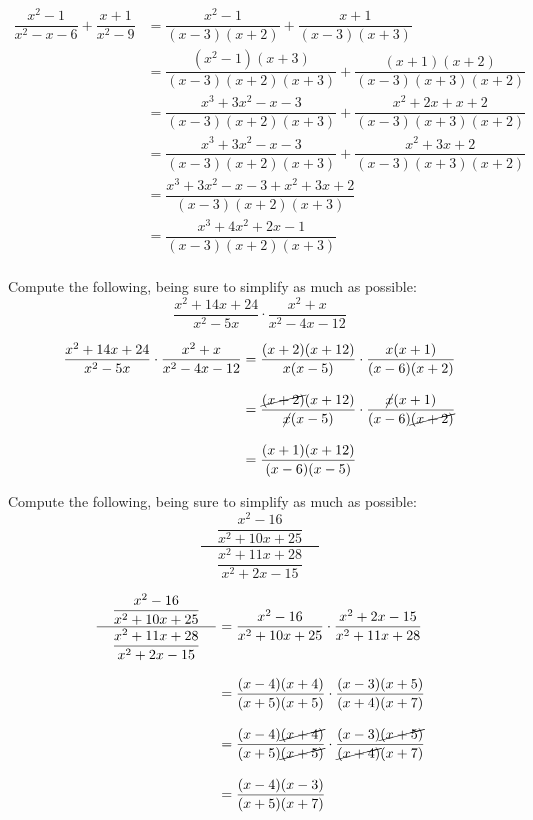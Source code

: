 \documentclass[12pt,letterpaper]{exam}
\begin{document}
\begin{questions}
	\[
	\begin{aligned}
	\dfrac{x^2 - 1}{x^2 - x - 6} + \dfrac{x + 1}{x^2 - 9}&= \dfrac{x^2 - 1}{(x - 3)(x + 2)} + \dfrac{x + 1}{(x - 3)(x + 3)} \\[0.3cm]
	&= \dfrac{(x^2 - 1)(x + 3)}{(x - 3)(x + 2)(x + 3)} + \dfrac{(x + 1)(x + 2)}{(x - 3)(x + 3)(x + 2)} \\[0.3cm]
	&= \dfrac{x^3 + 3x^2 - x - 3}{(x - 3)(x + 2)(x + 3)} + \dfrac{x^2 + 2x + x + 2}{(x - 3)(x + 3)(x + 2)} \\[0.3cm]
	&= \dfrac{x^3 + 3x^2 - x - 3}{(x - 3)(x + 2)(x + 3)} + \dfrac{x^2 + 3x + 2}{(x - 3)(x + 3)(x + 2)} \\[0.3cm]
	&= \dfrac{x^3 + 3x^2 - x - 3 + x^2 + 3x + 2}{(x - 3)(x + 2)(x + 3)} \\[0.3cm]
	&= \dfrac{x^3 + 4x^2 + 2x - 1}{(x - 3)(x + 2)(x + 3)} \\[0.3cm]
	\end{aligned}
	\]



\newpage
\question[6] Compute the following, being sure to simplify as much as possible:
	\[
	\dfrac{x^2 + 14x + 24}{x^2 - 5x} \cdot \dfrac{x^2 + x}{x^2 - 4x - 12}
	\] \pspace
	
	\[
	\begin{aligned}
	\dfrac{x^2 + 14x + 24}{x^2 - 5x} \cdot \dfrac{x^2 + x}{x^2 - 4x - 12}&= \dfrac{(x + 2)(x + 12)}{x(x - 5)} \cdot \dfrac{x(x + 1)}{(x - 6)(x + 2)} \\[0.3cm]
	&= \dfrac{\cancel{(x + 2)}(x + 12)}{\cancel{x}(x - 5)} \cdot \dfrac{\cancel{x}(x + 1)}{(x - 6)\cancel{(x + 2)}} \\[0.3cm]
	&= \dfrac{(x + 1)(x + 12)}{(x - 6)(x - 5)}
	\end{aligned}
	\]



\newpage
\question[7] Compute the following, being sure to simplify as much as possible:
	\[
	\dfrac{\phantom{.}\;\;\;\dfrac{x^2 - 16}{x^2 + 10x + 25}\;\;\;\phantom{.}}{\dfrac{x^2 + 11x + 28}{x^2 + 2x - 15}}
	\] \pspace
	
	\[
	\begin{aligned}
	\dfrac{\phantom{.}\;\;\;\dfrac{x^2 - 16}{x^2 + 10x + 25}\;\;\;\phantom{.}}{\dfrac{x^2 + 11x + 28}{x^2 + 2x - 15}}&= \dfrac{x^2 - 16}{x^2 + 10x + 25} \cdot \dfrac{x^2 + 2x - 15}{x^2 + 11x + 28} \\[0.3cm]
	&= \dfrac{(x - 4)(x + 4)}{(x + 5)(x + 5)} \cdot \dfrac{(x - 3)(x + 5)}{(x + 4)(x + 7)} \\[0.3cm]
	&= \dfrac{(x - 4)\cancel{(x + 4)}}{(x + 5)\cancel{(x + 5)}} \cdot \dfrac{(x - 3)\cancel{(x + 5)}}{\cancel{(x + 4)}(x + 7)} \\[0.3cm]
	&= \dfrac{(x - 4)(x - 3)}{(x + 5)(x + 7)}
	\end{aligned}
	\]




\end{questions}
\end{document}

